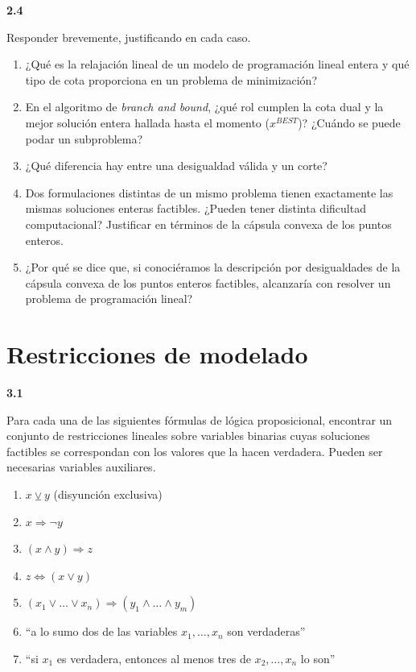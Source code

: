\documentclass[11pt,a4paper]{article}
\newcommand{\ejercicio}[1]{\par\medskip\noindent\textbf{#1}\par\nopagebreak\smallskip}
\begin{document}
\ejercicio{2.4}
Responder brevemente, justificando en cada caso.
\begin{enumerate}
  \item ¿Qué es la relajación lineal de un modelo de programación lineal entera
  y qué tipo de cota proporciona en un problema de minimización?
  \item En el algoritmo de \emph{branch and bound}, ¿qué rol cumplen la cota
  dual y la mejor solución entera hallada hasta el momento ($x^{BEST}$)?
  ¿Cuándo se puede podar un subproblema?
  \item ¿Qué diferencia hay entre una desigualdad válida y un corte?
  \item Dos formulaciones distintas de un mismo problema tienen exactamente las
  mismas soluciones enteras factibles. ¿Pueden tener distinta dificultad
  computacional? Justificar en términos de la cápsula convexa de los puntos
  enteros.
  \item ¿Por qué se dice que, si conociéramos la descripción por desigualdades
  de la cápsula convexa de los puntos enteros factibles, alcanzaría con resolver
  un problema de programación lineal?
\end{enumerate}

\section{Restricciones de modelado}

\ejercicio{3.1}
Para cada una de las siguientes fórmulas de lógica proposicional, encontrar un
conjunto de restricciones lineales sobre variables binarias cuyas soluciones
factibles se correspondan con los valores que la hacen verdadera. Pueden ser
necesarias variables auxiliares.
\begin{enumerate}[label=\alph*),itemsep=1pt]
  \item $x \veebar y$ (disyunción exclusiva)
  \item $x \Rightarrow \neg y$
  \item $(x \wedge y) \Rightarrow z$
  \item $z \Leftrightarrow (x \vee y)$
  \item $(x_1 \vee \dots \vee x_n) \Rightarrow (y_1 \wedge \dots \wedge y_m)$
  \item ``a lo sumo dos de las variables $x_1,\dots,x_n$ son verdaderas''
  \item ``si $x_1$ es verdadera, entonces al menos tres de
  $x_2,\dots,x_n$ lo son''
\end{enumerate}
\end{document}
